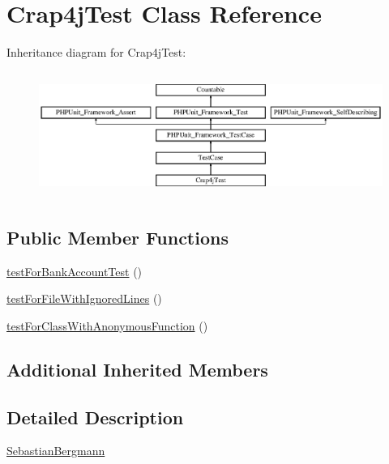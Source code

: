 \hypertarget{class_sebastian_bergmann_1_1_code_coverage_1_1_report_1_1_crap4j_test}{}\section{Crap4j\+Test Class Reference}
\label{class_sebastian_bergmann_1_1_code_coverage_1_1_report_1_1_crap4j_test}
Inheritance diagram for Crap4j\+Test\+:\begin{figure}[H]
\begin{center}
\leavevmode
\includegraphics[height=4.129793cm]{class_sebastian_bergmann_1_1_code_coverage_1_1_report_1_1_crap4j_test}
\end{center}
\end{figure}
\subsection*{Public Member Functions}
\begin{DoxyCompactItemize}
\item 
\mbox{\hyperlink{class_sebastian_bergmann_1_1_code_coverage_1_1_report_1_1_crap4j_test_ad9fed07aad4f99ced47846343159b5f9}{test\+For\+Bank\+Account\+Test}} ()
\item 
\mbox{\hyperlink{class_sebastian_bergmann_1_1_code_coverage_1_1_report_1_1_crap4j_test_a56dd0d19a0cf97658af874006a48fcf5}{test\+For\+File\+With\+Ignored\+Lines}} ()
\item 
\mbox{\hyperlink{class_sebastian_bergmann_1_1_code_coverage_1_1_report_1_1_crap4j_test_a1f10d167be4113a4aa37e6c1633e4d01}{test\+For\+Class\+With\+Anonymous\+Function}} ()
\end{DoxyCompactItemize}
\subsection*{Additional Inherited Members}


\subsection{Detailed Description}
\mbox{\hyperlink{namespace_sebastian_bergmann}{Sebastian\+Bergmann}} 

